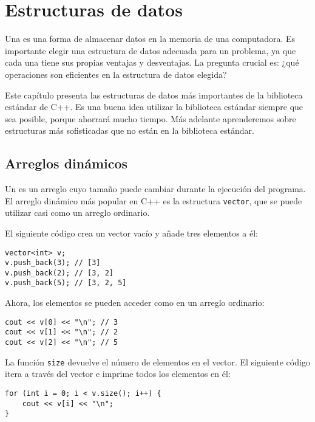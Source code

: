 \chapter{Estructuras de datos}


Una  es una forma de almacenar
datos en la memoria de una computadora.
Es importante elegir una estructura de datos adecuada
para un problema,
ya que cada una tiene sus propias
ventajas y desventajas.
La pregunta crucial es: ¿qué operaciones
son eficientes en la estructura de datos elegida?

Este capítulo presenta las estructuras de datos más importantes
de la biblioteca estándar de C++.
Es una buena idea utilizar la biblioteca estándar
siempre que sea posible,
porque ahorrará mucho tiempo.
Más adelante aprenderemos sobre estructuras más sofisticadas
que no están en la biblioteca estándar.

\section{Arreglos dinámicos}


Un  es un arreglo cuyo
tamaño puede cambiar durante la ejecución
del programa.
El arreglo dinámico más popular en C++ es
la estructura \texttt{vector},
que se puede utilizar casi como un arreglo ordinario.

El siguiente código crea un vector vacío y
añade tres elementos a él:

\begin{lstlisting}
vector<int> v;
v.push_back(3); // [3]
v.push_back(2); // [3, 2]
v.push_back(5); // [3, 2, 5]
\end{lstlisting}

Ahora, los elementos se pueden acceder como en un arreglo ordinario:

\begin{lstlisting}
cout << v[0] << "\n"; // 3
cout << v[1] << "\n"; // 2
cout << v[2] << "\n"; // 5
\end{lstlisting}

La función \texttt{size} devuelve el número de elementos en el vector.
El siguiente código itera a través
del vector e imprime todos los elementos en él:

\begin{lstlisting}
for (int i = 0; i < v.size(); i++) {
    cout << v[i] << "\n";
}
\end{lstlisting}

